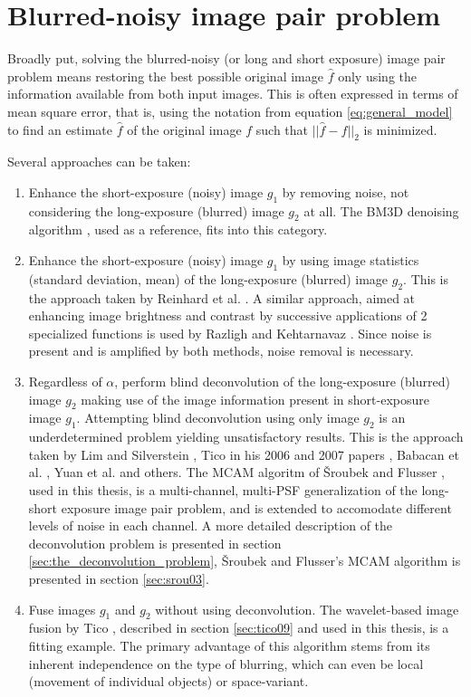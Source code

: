 \documentclass[12pt,notitlepage]{report}
\begin{document}
\section{Blurred-noisy image pair problem}
\label{sec:blurred_noisy}

Broadly put, solving the blurred-noisy (or long and short exposure) image pair problem means restoring the best possible original image $\hat{f}$ only using the information available from both input images. This is often expressed in terms of mean square error, that is, using the notation from equation \ref{eq:general_model} to find an estimate $\hat{f}$ of the original image $f$ such that $|| \hat{f} - f ||_2$ is minimized.

Several approaches can be taken:
\begin{enumerate}
	\item Enhance the short-exposure (noisy) image $g_1$ by removing noise, not considering the long-exposure (blurred) image $g_2$ at all. The BM3D denoising algorithm \cite{bm3d}, used as a reference, fits into this category.
	\item Enhance the short-exposure (noisy) image $g_1$ by using image statistics (standard deviation, mean) of the long-exposure (blurred) image $g_2$. This is the approach taken by Reinhard et al. \cite{rein01}. A similar approach, aimed at enhancing image brightness and contrast by successive applications of 2 specialized functions is used by Razligh and Kehtarnavaz \cite{razl07}. Since noise is present and is amplified by both methods, noise removal is necessary. 
	\item Regardless of $\alpha$, perform blind deconvolution of the long-exposure (blurred) image $g_2$ making use of the image information present in short-exposure image $g_1$. Attempting blind deconvolution using only image $g_2$ is an underdetermined problem yielding unsatisfactory results. This is the approach taken by Lim and Silverstein \cite{lim08}, Tico in his 2006 and 2007 papers \cite{tico06} \cite{tico07},  Babacan et al. \cite{baba09}, Yuan et al. \cite{yuan07} and others. The MCAM algoritm of Šroubek and Flusser \cite{srou03}, used in this thesis, is a multi-channel, multi-PSF generalization of the long-short exposure image pair problem, and is extended to accomodate different levels of noise in each channel. A more detailed description of the deconvolution problem is presented in section \ref{sec:the_deconvolution_problem}, Šroubek and Flusser's MCAM algorithm is presented in section \ref{sec:srou03}.
	\item Fuse images $g_1$ and $g_2$ without using deconvolution. The wavelet-based image fusion by Tico \cite{tico09}, described in section \ref{sec:tico09} and used in this thesis, is a fitting example. The primary advantage of this algorithm stems from its inherent independence on the type of blurring, which can even be local (movement of individual objects) or space-variant.
\end{enumerate}  
\end{document}
